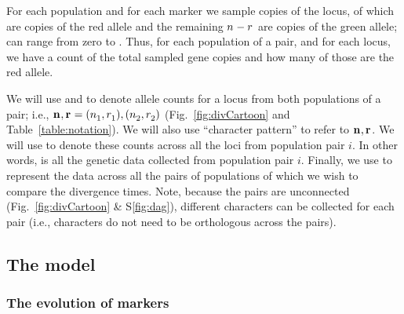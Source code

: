 For each population and for each marker we sample \allelecount
copies of the locus, \redallelecount of which are copies of the red
allele and the remaining $\allelecount - \redallelecount$ are
copies of the green allele;
\redallelecount can range from zero to \allelecount.
Thus, for each population of a pair, and for each locus, we have a count of the
total sampled gene copies and how many of those are the red allele.

\ifembed{

}{}

We will use \leafallelecounts and \leafredallelecounts to denote allele counts
for a locus from both populations of a pair; i.e., 
$\leafallelecounts, \leafredallelecounts = (\allelecount[1], \redallelecount[1]), 
(\allelecount[2], \redallelecount[2])$
(Fig.~\ref{fig:divCartoon}
and
Table~\ref{table:notation}).
We will also use ``character pattern'' to refer to $\leafallelecounts,
\leafredallelecounts$.
We will use \comparisondata[i] to denote these counts across all the loci from
population pair $i$.
In other words, \comparisondata[i] is all the genetic data collected from
population pair $i$.
Finally, we use \alldata to represent the data across all the pairs of
populations of which we wish to compare the divergence times.
Note, because the pairs are unconnected
(Fig.~\ref{fig:divCartoon} \& S\ref{fig:dag}),
different characters can be collected for each pair (i.e., characters do not
need to be orthologous across the pairs).

% 

\subsection{The model}

\subsubsection{The evolution of markers}

